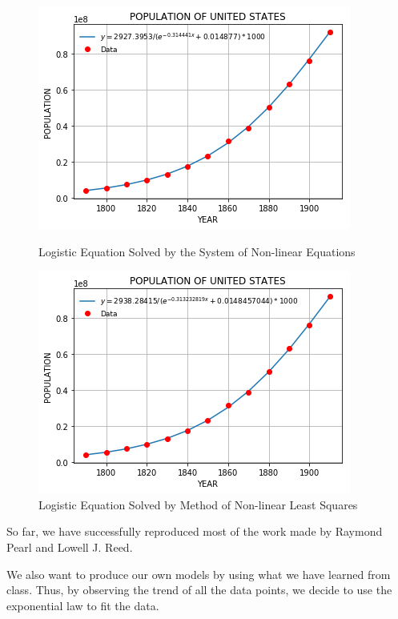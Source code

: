\documentclass[a4paper]{article}
\begin{document}
\begin{figure}[h]
  \includegraphics[width=\linewidth]{logistic_fsolve}
  \caption{Logistic Equation Solved by the System of Non-linear Equations}
  \label{fig:2}
  \vspace{2cm}
  \includegraphics[width=\linewidth]{logistic}
  \caption{Logistic Equation Solved by Method of Non-linear Least Squares}
  \label{fig:3}
\end{figure}

\clearpage

So far, we have successfully reproduced most of the work made by Raymond Pearl and Lowell J. Reed. \

We also want to produce our own models by using what we have learned from class. Thus, by observing the trend of all the data points, we decide to use the exponential law to fit the data. \
\end{document}
